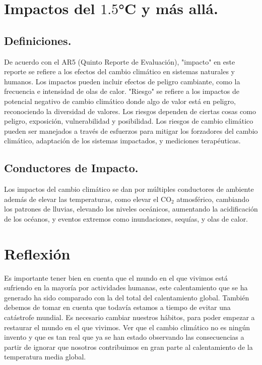 \documentclass{article}
\begin{document}
\section{Impactos del $1.5$°C y más allá.}

\subsection{Definiciones.}

De acuerdo con el AR5 (Quinto Reporte de Evaluación), "impacto" en este reporte se refiere a los efectos del cambio climático en sistemas naturales y humanos. Los impactos pueden incluir efectos de peligro cambiante, como la frecuencia e intensidad de olas de calor. "Riesgo" se refiere a los impactos de potencial negativo de cambio climático donde algo de valor está en peligro, reconociendo la diversidad de valores. Los riesgos dependen de ciertas cosas como peligro, exposición, vulnerabilidad y posibilidad. Los riesgos de cambio climático pueden ser manejados a través de esfuerzos para mitigar los forzadores del cambio climático, adaptación de los sistemas impactados, y mediciones terapéuticas.


\subsection{Conductores de Impacto.}

Los impactos del cambio climático se dan por múltiples conductores de ambiente además de elevar las temperaturas, como elevar el CO$_2$ atmosférico, cambiando los patrones de lluvias, elevando los niveles oceánicos, aumentando la acidificación de los océanos, y eventos extremos como inundaciones, sequías, y olas de calor.

\section{Reflexión}

Es importante tener bien en cuenta que el mundo en el que vivimos está sufriendo en la mayoría por actividades humanas, este calentamiento que se ha generado ha sido comparado con la del total del calentamiento global. También debemos de tomar en cuenta que todavía estamos a tiempo de evitar una catástrofe mundial. Es necesario cambiar nuestros hábitos, para poder empezar a restaurar el mundo en el que vivimos. Ver que el cambio climático no es ningún invento y que es tan real que ya se han estado observando las consecuencias a partir de ignorar que nosotros contribuimos en gran parte al calentamiento de la temperatura media global.
\end{document}
